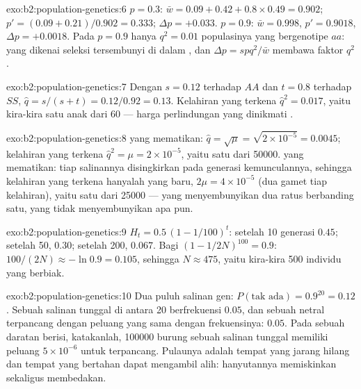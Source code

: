 \begin{solution}{exo:b2:population-genetics:6}
$p = 0.3$: $\bar w = 0.09 + 0.42 + 0.8\times 0.49 = 0.902$; $p' =
(0.09 + 0.21)/0.902 = 0.333$; $\Delta p = +0.033$. $p = 0.9$: $\bar w
= 0.998$, $p' = 0.9018$, $\Delta p = +0.0018$. Pada $p = 0.9$ hanya
$q^{2} = 0.01$ populasinya yang bergenotipe $aa$:  yang dikenai
seleksi tersembunyi di dalam , dan $\Delta p = spq^{2}/\bar w$ membawa faktor $q^{2}$.
\end{solution}

\begin{solution}{exo:b2:population-genetics:7}
Dengan $s = 0.12$ terhadap $AA$ dan $t = 0.8$ terhadap $SS$, $\hat q =
s/(s + t) = 0.12/0.92 = 0.13$. Kelahiran yang terkena $\hat q^{2} = 0.017$, yaitu kira-kira satu anak dari 60 --- harga perlindungan yang
dinikmati .
\end{solution}

\begin{solution}{exo:b2:population-genetics:8}
  yang mematikan: $\hat q = \sqrt{\mu} = \sqrt{2\times 10^{-5}} =
0.0045$; kelahiran yang terkena $\hat q^{2} = \mu = 2\times 10^{-5}$,
yaitu satu dari \num{50000}.   yang mematikan: tiap
salinannya disingkirkan pada generasi kemunculannya, sehingga kelahiran
yang terkena hanyalah  yang baru, $2\mu = 4\times 10^{-5}$ (dua
gamet tiap kelahiran), yaitu satu dari \num{25000} --- yang 
menyembunyikan  dua ratus berbanding satu, yang  tidak
menyembunyikan apa pun.
\end{solution}

\begin{solution}{exo:b2:population-genetics:9}
$H_t = 0.5\,(1 - 1/100)^{t}$: setelah 10 generasi $0.45$; setelah 50,
$0.30$; setelah 200, $0.067$. Bagi $(1 - 1/2N)^{100} = 0.9$:
$100/(2N) \approx -\ln 0.9 = 0.105$, sehingga $N \approx 475$, yaitu
kira-kira 500 individu yang berbiak.
\end{solution}

\begin{solution}{exo:b2:population-genetics:10}
Dua puluh salinan gen: $P(\text{tak ada}) = 0.9^{20} = 0.12$. Sebuah
salinan tunggal di antara 20 berfrekuensi $0.05$, dan sebuah 
netral terpancang dengan peluang yang sama dengan frekuensinya:
$0.05$. Pada sebuah daratan berisi, katakanlah, \num{100000} burung
sebuah salinan tunggal memiliki peluang $5\times 10^{-6}$ untuk
terpancang. Pulaunya adalah tempat  yang jarang hilang dan tempat
 yang bertahan dapat mengambil alih: hanyutannya memiskinkan
sekaligus membedakan.
\end{solution}

